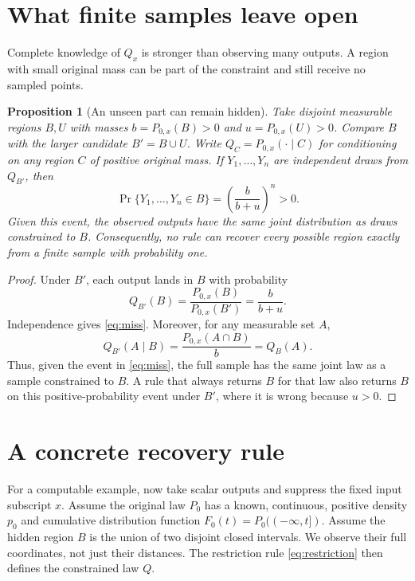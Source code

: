 \documentclass[10pt,letterpaper]{article}
\theoremstyle{typed}
\newtheorem{proposition}[lemma]{Proposition}
\begin{document}
\section{What finite samples leave open}

Complete knowledge of $Q_x$ is stronger than observing many outputs. A region with small original mass can be part of the constraint and still receive no sampled points.

\begin{proposition}[An unseen part can remain hidden]
Take disjoint measurable regions $B,U$ with masses $b=P_{0,x}(B)>0$ and $u=P_{0,x}(U)>0$. Compare $B$ with the larger candidate $B'=B\cup U$. Write $Q_C=P_{0,x}(\cdot\mid C)$ for conditioning on any region $C$ of positive original mass. If $Y_1,\ldots,Y_n$ are independent draws from $Q_{B'}$, then
\begin{equation}
  \Pr\{Y_1,\ldots,Y_n\in B\}
  =\left(\frac{b}{b+u}\right)^n>0.
  \label{eq:miss}
\end{equation}
Given this event, the observed outputs have the same joint distribution as draws constrained to $B$. Consequently, no rule can recover every possible region exactly from a finite sample with probability one.
\end{proposition}
\begin{proof}
Under $B'$, each output lands in $B$ with probability
\[
  Q_{B'}(B)=\frac{P_{0,x}(B)}{P_{0,x}(B')}=\frac{b}{b+u}.
\]
Independence gives \eqref{eq:miss}. Moreover, for any measurable set $A$,
\[
  Q_{B'}(A\mid B)
  =\frac{P_{0,x}(A\cap B)}{b}
  =Q_B(A).
\]
Thus, given the event in \eqref{eq:miss}, the full sample has the same joint law as a sample constrained to $B$. A rule that always returns $B$ for that law also returns $B$ on this positive-probability event under $B'$, where it is wrong because $u>0$.
\end{proof}

\section{A concrete recovery rule}

For a computable example, now take scalar outputs and suppress the fixed input subscript $x$. Assume the original law $P_0$ has a known, continuous, positive density $p_0$ and cumulative distribution function $F_0(t)=P_0((-\infty,t])$. Assume the hidden region $B$ is the union of two disjoint closed intervals. We observe their full coordinates, not just their distances. The restriction rule \eqref{eq:restriction} then defines the constrained law $Q$.
\end{document}
